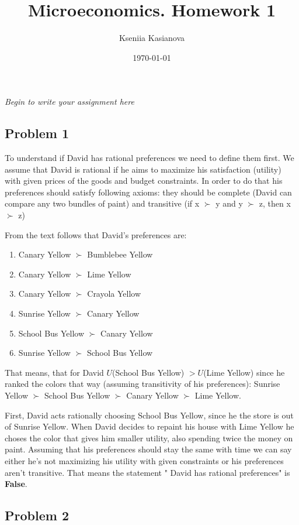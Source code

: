 \documentclass[a4paper,12pt]{article} %
\author{Kseniia Kasianova}
\title{Microeconomics. Homework 1}
\date{\today}
\newcommand{\latinword}[1]{\textsf{\itshape #1}}%
\begin{document}
{\color{blue} \latinword{Begin to write your assignment here}}

\noindent\makebox[\linewidth]{\rule{\textwidth}{0.4pt}}


\subsection*{Problem 1}

To understand if  David has rational preferences we need to define them first. We assume that David is rational if he aims to maximize his satisfaction (utility)
 with given  prices of the goods and budget constraints. In order to do that 
 his preferences should satisfy following axioms: they should be complete (David can compare any two bundles of paint)  and  transitive (if x  $ \succ $  y and y  $ \succ $  z, then x  $ \succ $  z) 


From the text follows that David's preferences are:

\begin{enumerate}
	\item  Canary Yellow $ \succ $ Bumblebee Yellow
	\item  Canary Yellow $ \succ $ Lime Yellow
	\item  Canary Yellow $ \succ $ Crayola Yellow
	\item  Sunrise Yellow $ \succ $  Canary Yellow
	\item  School Bus Yellow $ \succ $  Canary Yellow
	\item  Sunrise Yellow $ \succ $   School Bus Yellow
\end{enumerate}

That means, that for David $ U$(School Bus Yellow) $ > U$(Lime Yellow)
since he ranked the colors that way (assuming transitivity of his preferences):
Sunrise Yellow $ \succ $   School Bus Yellow   $ \succ $  Canary Yellow $ \succ $ Lime Yellow. 

First, David acts rationally choosing  School Bus Yellow, since he the store is out of  
Sunrise Yellow. 
When David
decides to repaint his house with Lime Yellow he choses the color that gives him smaller utility, also   spending  twice the money on  paint. Assuming that his preferences should stay the same with time we can say either he's  not maximizing his utility with given constraints or his preferences aren't transitive.  That means the statement " David has rational preferences" is 
\textbf{False}.

\subsection*{Problem 2}
\end{document}
